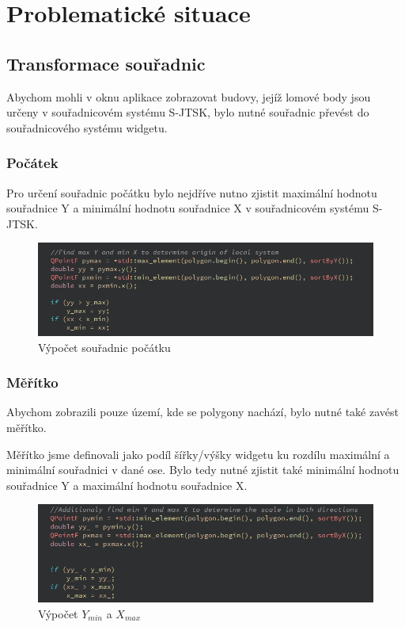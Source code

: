 \documentclass[11pt]{article}
\begin{document}
	\section{Problematické situace}
	
	\subsection{Transformace souřadnic}
	Abychom mohli v oknu aplikace zobrazovat budovy, jejíž lomové body jsou určeny v souřadnicovém systému S-JTSK, bylo nutné souřadnic převést do souřadnicového systému widgetu. 
	
	\subsubsection{Počátek}
	Pro určení souřadnic počátku bylo nejdříve nutno zjistit maximální hodnotu souřadnice Y a minimální hodnotu souřadnice X v souřadnicovém systému S-JTSK. 
	
	\begin{figure}[htbh]
		\centering
		\includegraphics[scale=0.8]{images/U2_problem_pocatek.png} 
		\caption{Výpočet souřadnic počátku}
		\label{fig:problem_origin}
	\end{figure} 
	
	\subsubsection{Měřítko}
	Abychom zobrazili pouze území, kde se polygony nachází, bylo nutné také zavést měřítko.
	
	Měřítko jsme definovali jako podíl šířky/výšky widgetu ku rozdílu maximální a minimální souřadnici v dané ose. Bylo tedy nutné zjistit také minimální hodnotu souřadnice Y a maximální hodnotu souřadnice X.
	
	\begin{figure}[htbh]
		\centering
		\includegraphics[scale=0.8]{images/U2_problem_meritko1.png} 
		\caption{Výpočet $ Y_{min} $ a $ X_{max} $}
		\label{fig:problem_scale1}
	\end{figure} 
	
\end{document}
